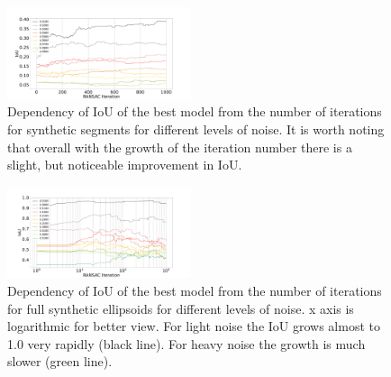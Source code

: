 \begin{figure}[!htb]
  \centering
      \includegraphics[width=0.48\textwidth]{images/segment_normal_noise_count_0.1_IoU_RANSAC_Iteration}
      \caption{Dependency of IoU of the best model from the number of iterations for synthetic segments for different levels of noise. It is worth noting that overall with the growth of the iteration number there is a slight, but noticeable improvement in IoU.}
      \label{fig:segment_normal_noise_count_0.1_IoU_RANSAC_Iteration}
\end{figure}

\begin{figure}[!htb]
  \centering
      \includegraphics[width=0.48\textwidth]{images/normal_noise_count_0.1_IoU_RANSAC_Iteration}
      \caption{Dependency of IoU of the best model from the number of iterations for full synthetic ellipsoids for different levels of noise. x axis is logarithmic for better view. For light noise the IoU grows almost to 1.0 very rapidly (black line). For heavy noise the growth is much slower (green line).}
      \label{fig:normal_noise_count_0.1_IoU_RANSAC_Iteration}
\end{figure}


